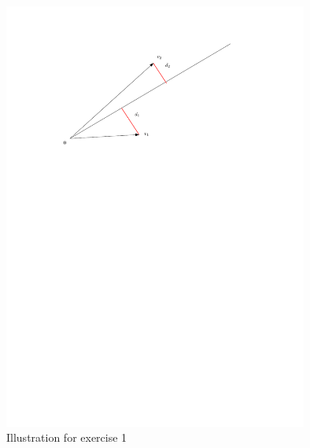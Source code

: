 \documentclass[12pt,a4paper]{article}
\theoremstyle{plain}
\theoremstyle{definition}
\begin{document}
\begin{figure}[h]
  \begin{center}
    \includegraphics[width=10cm]{Figure.pdf}
    
  \end{center}
    \caption{Illustration for exercise 1} 

  \end{figure}
\end{document}
